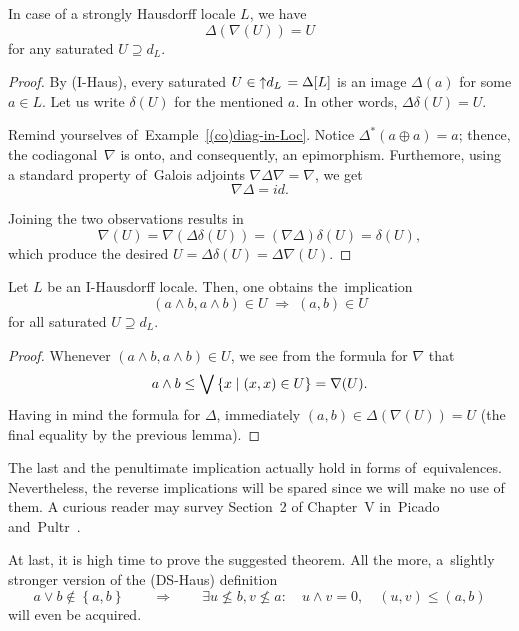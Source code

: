 \begin{lem} \label{meets-in-satur}
  In case of a strongly Hausdorff locale $L$, we have
  \[
    \Delta(\nabla(U)) = U
  \]
  for any saturated $U \supseteq d_L$.
\end{lem}
\begin{proof}
  By (I-Haus), every saturated $U\in \left\uparrow d_L \right. = \Delta[L]$ is an image
  $\Delta(a)$ for some $a\in L$.
  Let us write $\delta(U)$ for the mentioned $a$.
  In other words, $\Delta\delta(U) = U$.

  Remind yourselves of~Example~\ref{(co)diag-in-Loc}\thinspace.
  Notice $\Delta^*(a \oplus a) = a$;
  thence, the codiagonal~$\nabla$ is onto, and consequently, an epimorphism.
  Furthemore, using a standard property of~Galois adjoints $\nabla \Delta
  \nabla = \nabla$,
  we get
  \[
    \nabla \Delta = id.
  \]

  Joining the two observations results in
  \[
    \nabla (U) = \nabla (\Delta\delta (U)) = (\nabla \Delta)\delta (U) = \delta(U),
  \]
  which produce the desired $U = \Delta \delta (U) = \Delta \nabla (U)$.
\end{proof}

\begin{lem} \label{meets-in-satur}
  Let $L$ be an I-Hausdorff locale.
  Then, one obtains the~implication
  \[
    \left( a \wedge b, a \wedge b \right) \in U
    \; \Rightarrow \;
    \left( a, b \right) \in U
  \]
  for all saturated $U \supseteq d_L$.
\end{lem}
\begin{proof}
  Whenever $(a \wedge b, a \wedge b)\in U$, we see from the formula for
  $\nabla$ that
  \[
    a \wedge b \leq \bigvee \left\{ x \mid (x, x) \in U \right\} = \nabla(U).
  \]
  Having in mind the formula for $\Delta$, immediately $(a, b) \in \Delta( \nabla(U) ) = U$
  (the final equality by the previous lemma).
\end{proof}

\begin{rem}
  The last and the penultimate implication actually hold in forms
  of~equivalences.
  Nevertheless, the reverse implications will be spared since we will make no
  use of them.
  A curious reader may survey Section~2 of Chapter~V in~Picado
  and~Pultr~\cite{picado-pultr12}.
\end{rem}

At last, it is high time to prove the suggested theorem.
All the more, a~slightly stronger version of the (DS-Haus) definition
\[
  a \vee b \not\in \left\{a, b\right\} \qquad \Rightarrow \qquad \exists
  u\not\leq b, v\not\leq a: \quad u \wedge v = 0, \quad \boxed{\left(u,
  v\right) \leq \left(a, b\right)}
\]
will even be acquired.

